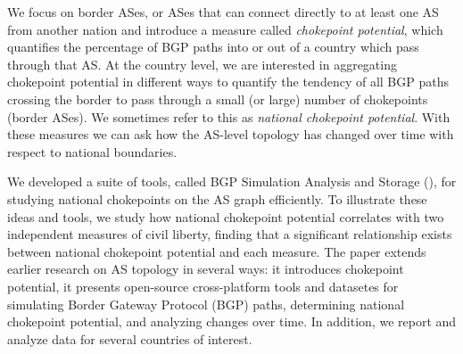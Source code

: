 We focus on border ASes, or ASes that can connect directly to at least
one AS from another nation and introduce a measure called \emph{chokepoint potential}, which quantifies the percentage of BGP paths into or out of a country which pass through that AS.  At the country level, we are interested in aggregating chokepoint potential in different ways to quantify the tendency of all BGP paths crossing the border to pass through a small (or large) number of chokepoints (border ASes). We sometimes refer to this as \emph{national chokepoint potential}.
With these measures 
we can ask how the AS-level topology has changed over time with respect
to national boundaries. 

We developed a
suite of tools, called BGP Simulation Analysis and Storage (\toolname{}), for studying national 
chokepoints on
the AS graph efficiently. To illustrate these ideas and tools, we
study how national chokepoint potential correlates with two independent
measures of civil liberty, finding that a significant relationship exists between national chokepoint potential and each measure.
The paper extends earlier research on AS topology in several ways: it introduces chokepoint potential, it presents open-source cross-platform tools and datasetes for simulating Border Gateway Protocol (BGP) paths,
determining national chokepoint potential, and analyzing changes over time.  In addition, we report and analyze data for several countries of interest.


